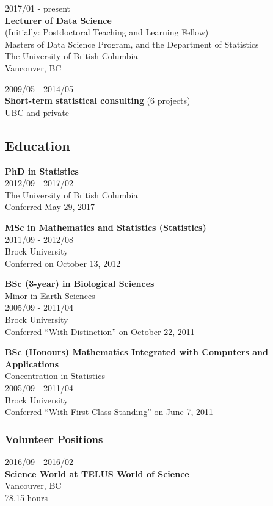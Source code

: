 \documentclass[]{article}
\begin{document}
2017/01 - present\\
\textbf{Lecturer of Data Science}\\
(Initially: Postdoctoral Teaching and Learning Fellow)\\
Masters of Data Science Program, and the Department of Statistics\\
The University of British Columbia\\
Vancouver, BC

2009/05 - 2014/05\\
\textbf{Short-term statistical consulting} (6 projects)\\
UBC and private

\hypertarget{education}{%
\subsection{Education}\label{education}}

\textbf{PhD in Statistics}\\
2012/09 - 2017/02\\
The University of British Columbia\\
Conferred May 29, 2017

\textbf{MSc in Mathematics and Statistics (Statistics)}\\
2011/09 - 2012/08\\
Brock University\\
Conferred on October 13, 2012

\textbf{BSc (3-year) in Biological Sciences}\\
Minor in Earth Sciences\\
2005/09 - 2011/04\\
Brock University\\
Conferred ``With Distinction'' on October 22, 2011

\textbf{BSc (Honours) Mathematics Integrated with Computers and Applications}\\
Concentration in Statistics\\
2005/09 - 2011/04\\
Brock University\\
Conferred ``With First-Class Standing'' on June 7, 2011

\hypertarget{volunteer-positions}{%
\subsubsection{Volunteer Positions}\label{volunteer-positions}}

2016/09 - 2016/02\\
\textbf{Science World at TELUS World of Science }\\
Vancouver, BC\\
78.15 hours
\end{document}

